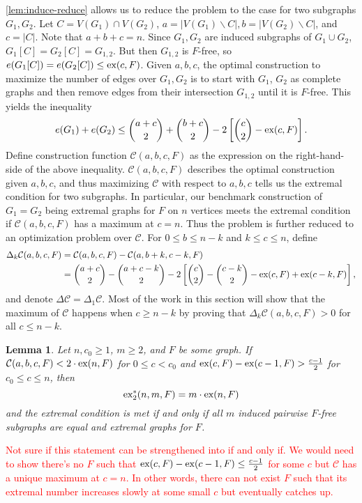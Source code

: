 \documentclass[12pt]{report}
\newtheorem{lemma}[theorem]{Lemma}
\newcommand*{\ex}{\textnormal{ex}}
\newcommand*{\dex}{\textnormal{ex}_2}
\newcommand*{\con}{\mathcal{C}}
\begin{document}
\cref{lem:induce-reduce} allows us to reduce the problem to the case for two subgraphs $G_1, G_2$. Let $C = V(G_1) \cap V(G_2)$, $a = |V(G_1) \backslash C|, b = |V(G_2) \backslash C|$, and $c = |C|$. Note that $a + b + c = n$. Since $G_1, G_2$ are induced subgraphs of $G_1 \cup G_2$, $G_1[C] = G_2[C] = G_{1, 2}$. But then $G_{1, 2}$ is $F$-free, so $e(G_1[C]) = e(G_2[C]) \leq \ex(c, F)$. Given $a, b, c$, the optimal construction to maximize the number of edges over $G_1, G_2$ is to start with $G_1$, $G_2$ as complete graphs and then remove edges from their intersection $G_{1, 2}$ until it is $F$-free. This yields the inequality
\[
  e(G_1) + e(G_2) \leq \binom{a + c}{2} + \binom{b + c}{2} - 2\left[\binom{c}{2} - \ex(c, F)\right].
\]
Define construction function $\con(a, b, c, F)$ as the expression on the right-hand-side of the above inequality. $\con(a, b, c, F)$ describes the optimal construction given $a, b, c$, and thus maximizing $\con$ with respect to $a, b, c$ tells us the extremal condition for two subgraphs. In particular, our benchmark construction of $G_1 = G_2$ being extremal graphs for $F$ on $n$ vertices meets the extremal condition if $\con(a, b, c, F)$ has a maximum at $c = n$. Thus the problem is further reduced to an optimization problem over $\con$. For $0 \leq b \leq n - k$ and $k \leq c \leq n$, define
\begin{align*}
  \Delta_k \con(a, b, c, F) 
  &= \con(a, b, c, F) - \con(a, b + k, c - k, F) \\
  &= \binom{a + c}{2} - \binom{a + c - k}{2} - 2\left[\binom{c}{2} - \binom{c - k}{2} - \ex(c, F) + \ex(c - k, F)\right],
\end{align*}
and denote $\Delta \con = \Delta_1 \con$. Most of the work in this section will show that the maximum of $\con$ happens when $c \geq n - k$ by proving that $\Delta_k \con(a, b, c, F) > 0$ for all $c \leq n - k$.

\begin{lemma}\label{lem:induce-cond}
  Let $n, c_0 \geq 1$, $m \geq 2$, and $F$ be some graph. If $\con(a, b, c, F)< 2 \cdot \ex(n, F)$ for $0 \leq c < c_0$ and $\ex(c, F) - \ex(c - 1, F) > \frac{c - 1}{2}$ for $c_0 \leq c \leq n$, then
  \[
    \dex^*(n, m, F) = m \cdot \ex(n, F)
  \]
  and the extremal condition is met if and only if all $m$ induced pairwise $F$-free subgraphs are equal and extremal graphs for $F$.
\end{lemma}

\textcolor{red}{Not sure if this statement can be strengthened into if and only if. We would need to show there's no $F$ such that $\ex(c, F) - \ex(c - 1, F) \leq \frac{c - 1}{2}$ for some $c$ but $\con$ has a unique maximum at $c = n$. In other words, there can not exist $F$ such that its extremal number increases slowly at some small $c$ but eventually catches up.}
\end{document}
